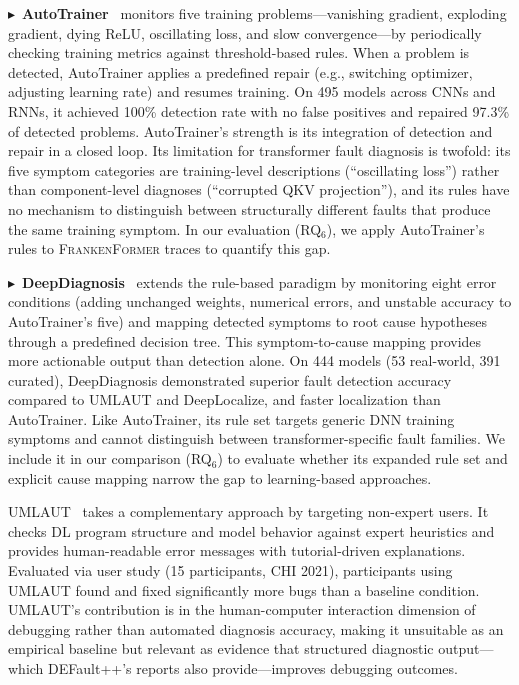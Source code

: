 $\blacktriangleright$~\textbf{AutoTrainer}~\cite{autotrainer} monitors five training problems---vanishing gradient, exploding gradient, dying ReLU, oscillating loss, and slow convergence---by periodically checking training metrics against threshold-based rules. When a problem is detected, AutoTrainer applies a predefined repair (e.g., switching optimizer, adjusting learning rate) and resumes training. On 495 models across CNNs and RNNs, it achieved 100\% detection rate with no false positives and repaired 97.3\% of detected problems. AutoTrainer's strength is its integration of detection and repair in a closed loop. Its limitation for transformer fault diagnosis is twofold: its five symptom categories are training-level descriptions (``oscillating loss'') rather than component-level diagnoses (``corrupted QKV projection''), and its rules have no mechanism to distinguish between structurally different faults that produce the same training symptom. In our evaluation (RQ$_6$), we apply AutoTrainer's rules to \textsc{FrankenFormer} traces to quantify this gap.

$\blacktriangleright$~\textbf{DeepDiagnosis}~\cite{deepdiagnosis} extends the rule-based paradigm by monitoring eight error conditions (adding unchanged weights, numerical errors, and unstable accuracy to AutoTrainer's five) and mapping detected symptoms to root cause hypotheses through a predefined decision tree. This symptom-to-cause mapping provides more actionable output than detection alone. On 444 models (53 real-world, 391 curated), DeepDiagnosis demonstrated superior fault detection accuracy compared to UMLAUT and DeepLocalize, and faster localization than AutoTrainer. Like AutoTrainer, its rule set targets generic DNN training symptoms and cannot distinguish between transformer-specific fault families. We include it in our comparison (RQ$_6$) to evaluate whether its expanded rule set and explicit cause mapping narrow the gap to learning-based approaches.

UMLAUT~\cite{umlaut} takes a complementary approach by targeting non-expert users. It checks DL program structure and model behavior against expert heuristics and provides human-readable error messages with tutorial-driven explanations. Evaluated via user study (15 participants, CHI 2021), participants using UMLAUT found and fixed significantly more bugs than a baseline condition. UMLAUT's contribution is in the human-computer interaction dimension of debugging rather than automated diagnosis accuracy, making it unsuitable as an empirical baseline but relevant as evidence that structured diagnostic output---which DEFault++'s reports also provide---improves debugging outcomes.

